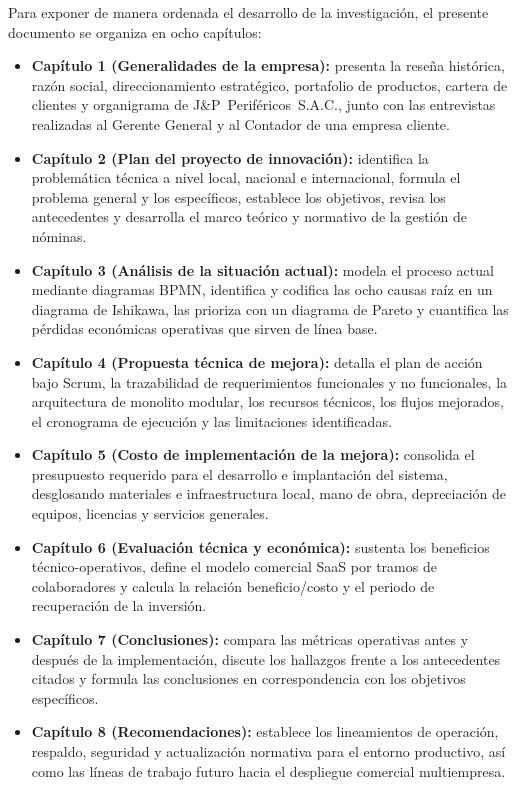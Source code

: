 Para exponer de manera ordenada el desarrollo de la investigación, el presente documento se organiza en ocho capítulos:

\begin{itemize}[leftmargin=*, topsep=4pt, itemsep=4pt]
    \item \textbf{Capítulo 1 (Generalidades de la empresa):} presenta la reseña histórica, razón social, direccionamiento estratégico, portafolio de productos, cartera de clientes y organigrama de J\&P~Periféricos~S.A.C., junto con las entrevistas realizadas al Gerente General y al Contador de una empresa cliente.
    \item \textbf{Capítulo 2 (Plan del proyecto de innovación):} identifica la problemática técnica a nivel local, nacional e internacional, formula el problema general y los específicos, establece los objetivos, revisa los antecedentes y desarrolla el marco teórico y normativo de la gestión de nóminas.
    \item \textbf{Capítulo 3 (Análisis de la situación actual):} modela el proceso actual mediante diagramas BPMN, identifica y codifica las ocho causas raíz en un diagrama de Ishikawa, las prioriza con un diagrama de Pareto y cuantifica las pérdidas económicas operativas que sirven de línea base.
    \item \textbf{Capítulo 4 (Propuesta técnica de mejora):} detalla el plan de acción bajo Scrum, la trazabilidad de requerimientos funcionales y no funcionales, la arquitectura de monolito modular, los recursos técnicos, los flujos mejorados, el cronograma de ejecución y las limitaciones identificadas.
    \item \textbf{Capítulo 5 (Costo de implementación de la mejora):} consolida el presupuesto requerido para el desarrollo e implantación del sistema, desglosando materiales e infraestructura local, mano de obra, depreciación de equipos, licencias y servicios generales.
    \item \textbf{Capítulo 6 (Evaluación técnica y económica):} sustenta los beneficios técnico-operativos, define el modelo comercial SaaS por tramos de colaboradores y calcula la relación beneficio/costo y el periodo de recuperación de la inversión.
    \item \textbf{Capítulo 7 (Conclusiones):} compara las métricas operativas antes y después de la implementación, discute los hallazgos frente a los antecedentes citados y formula las conclusiones en correspondencia con los objetivos específicos.
    \item \textbf{Capítulo 8 (Recomendaciones):} establece los lineamientos de operación, respaldo, seguridad y actualización normativa para el entorno productivo, así como las líneas de trabajo futuro hacia el despliegue comercial multiempresa.
\end{itemize}